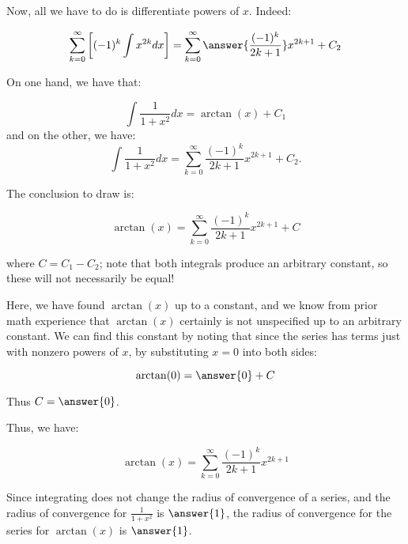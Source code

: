 \documentclass{ximera}
\begin{document}
\begin{exercise}
\begin{exercise}
\begin{exercise}
Now, all we have to do is differentiate powers of $x$.  Indeed:

\[
\sum_{k=0}^{\infty} \left[ (-1)^k \int x^{2k} dx  \right] = \sum_{k=0}^{\infty} \answer{\frac{(-1)^k}{2k+1}}x^{2k+1} +C_2
\]

\begin{exercise}
On one hand, we have that:

\[ \int \frac{1}{1+x^2} dx = \arctan(x) +C_1 \]
and on the other, we have: 
\[\int \frac{1}{1+x^2} dx = \sum_{k=0}^{\infty} \frac{(-1)^k}{2k+1}x^{2k+1} +C_2.\]

The conclusion to draw is:

\[
\arctan(x) = \sum_{k=0}^{\infty} \frac{(-1)^k}{2k+1}x^{2k+1} +C 
\]

where $C=C_1-C_2$; note that both integrals produce an arbitrary constant, so these will not necessarily be equal!

Here, we have found $\arctan(x)$ up to a constant, and we know from prior math experience that $\arctan(x)$ certainly is not unspecified up to an arbitrary constant. We can find this constant by noting that since the series has terms just with nonzero powers of $x$, by substituting $x=0$ into both sides:

\[
\arctan(0) = \answer{0} +C
\]

Thus $C= \answer{0}$.

\begin{exercise}
Thus, we have:

\[
\arctan(x) = \sum_{k=0}^{\infty} \frac{(-1)^k}{2k+1}x^{2k+1} 
\]

Since integrating does not change the radius of convergence of a series, and the radius of convergence for $\frac{1}{1+x^2}$ is $\answer{1}$, the radius of convergence for the series for $\arctan(x)$ is $\answer{1}$.

\end{exercise}
\end{exercise} 






\end{exercise}
\end{exercise}
\end{exercise}
\end{document}
